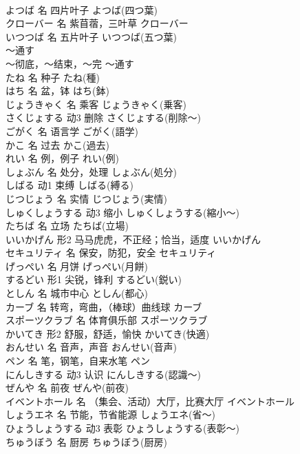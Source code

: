 \documentclass[8pt]{extreport}
\begin{document}
\begin{CJK}{UTF8}{min}
\\	よつば	名	四片叶子	よつば(四つ葉)	
\\	クローバー	名	紫苜蓿，三叶草	クローバー	
\\	いつつば	名	五片叶子	いつつば(五つ葉)	
\\	～通す	
\\	～彻底，～结束，～完	～通す	
\\	たね	名	种子	たね(種)	
\\	はち	名	盆，钵	はち(鉢)	
\\	じょうきゃく	名	乘客	じょうきゃく(乗客)	
\\	さくじょする	动3	删除	さくじょする(削除～)	
\\	ごがく	名	语言学	ごがく(語学)	
\\	かこ	名	过去	かこ(過去)	
\\	れい	名	例，例子	れい(例)	
\\	しょぶん	名	处分，处理	しょぶん(処分)	
\\	しばる	动1	束缚	しばる(縛る)	
\\	じつじょう	名	实情	じつじょう(実情)	
\\	しゅくしょうする	动3	缩小	しゅくしょうする(縮小～)	
\\	たちば	名	立场	たちば(立場)	
\\	いいかげん	形2	马马虎虎，不正经；恰当，适度	いいかげん	
\\	セキュリティ	名	保安，防犯，安全	セキュリティ	
\\	げっぺい	名	月饼	げっぺい(月餅)	
\\	するどい	形1	尖锐，锋利	するどい(鋭い)	
\\	としん	名	城市中心	としん(都心)	
\\	カーブ	名	转弯，弯曲，（棒球）曲线球	カーブ	
\\	スポーツクラブ	名	体育俱乐部	スポーツクラブ	
\\	かいてき	形2	舒服，舒适，愉快	かいてき(快適)	
\\	おんせい	名	音声，声音	おんせい(音声)	
\\	ペン	名	笔，钢笔，自来水笔	ペン	
\\	にんしきする	动3	认识	にんしきする(認識～)	
\\	ぜんや	名	前夜	ぜんや(前夜)	
\\	イベントホール	名	（集会、活动）大厅，比赛大厅	イベントホール	
\\	しょうエネ	名	节能，节省能源	しょうエネ(省～)	
\\	ひょうしょうする	动3	表彰	ひょうしょうする(表彰～)	
\\	ちゅうぼう	名	厨房	ちゅうぼう(厨房)	

\end{CJK}
\end{document}
